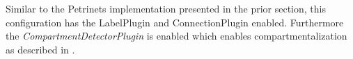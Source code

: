 Similar to the Petrinets implementation presented in the prior section, this configuration has the LabelPlugin and ConnectionPlugin enabled. Furthermore the \emph{CompartmentDetectorPlugin} is enabled which enables compartmentalization as described in .

